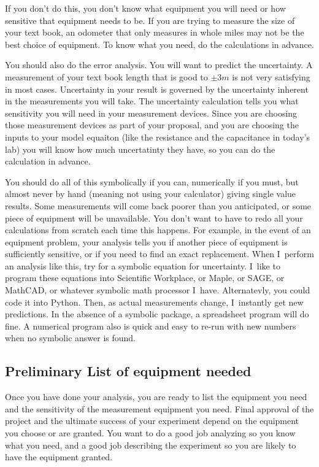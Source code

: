 If you don't do this, you don't know what equipment you will need or how
sensitive that equipment needs to be. If you are trying to measure the size
of your text book, an odometer that only measures in whole miles may not be
the best choice of equipment. To know what you need, do the calculations in
advance.

You should also do the error analysis. You will want to predict the
uncertainty. A measurement of your text book length that is good to $\pm 3%
\unit{m}$ is not very satisfying in most cases. Uncertainty in your result
is governed by the uncertainty inherent in the measurements you will take.
The uncertainty calculation tells you what sensitivity you will need in your
measurement devices. Since you are choosing those measurement devices as
part of your proposal, and you are choosing the inputs to your model
equaiton (like the resistance and the capacitance in today's lab) you will
know how much uncertatinty they have, so you can do the calculation in
advance.

You should do all of this symbolically if you can, numerically if you must,
but almost never by hand (meaning not using your calculator) giving single
value results. Some measurements will come back poorer than you anticipated,
or some piece of equipment will be unavailable. You don't want to have to
redo all your calculations from scratch each time this happens. For example,
in the event of an equipment problem, your analysis tells you if another
piece of equipment is sufficiently sensitive, or if you need to find an
exact replacement. When I\ perform an analysis like this, try for a symbolic
equation for uncertainty. I\ like to program these equations into Scientific
Workplace, or Maple, or SAGE, or MathCAD, or whatever symbolic math
processor I\ have. Alternatevly, you could code it into Python. Then, as
actual measurements change, I\ instantly get new predictions. In the absence
of a symbolic package, a spreadsheet program will do fine. A numerical
program also is quick and easy to re-run with new numbers when no symbolic
answer is found.

\subsection{Preliminary List of equipment needed}

Once you have done your analysis, you are ready to list the equipment you
need and the sensitivity of the measurement equipment you need. Final
approval of the project and the ultimate success of your experiment depend
on the equipment you choose or are granted. You want to do a good job
analyzing so you know what you need, and a good job describing the
experiment so you are likely to have the equipment granted.

